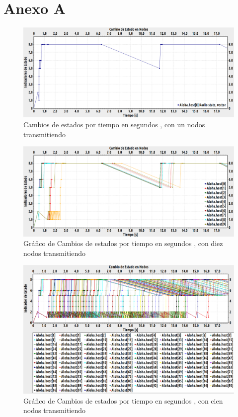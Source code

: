 \chapter{Anexo A}

\begin{figure}[!ht]
\centering
\includegraphics[angle=270, scale=0.4]{images/cambioestado1nodo-ideal.eps}
\caption{Cambios de estados por tiempo en segundos , con un nodos transmitiendo}
\label{anexa:1}
\end{figure}

\begin{figure}[!ht]
\centering
\includegraphics[angle=270, scale=0.4]{images/cambioestado10nodos.eps}
\caption{Gráfico de Cambios de estados por tiempo en segundos , con diez nodos transmitiendo}
\label{anexa:2}
\end{figure}

\begin{figure}[!ht]
\centering
\includegraphics[angle=270, scale=0.4]{images/cambioestado100nodos.eps}
\caption{Gráfico de Cambios de estados por tiempo en segundos , con cien nodos transmitiendo}
\label{anexa:3}
\end{figure}


